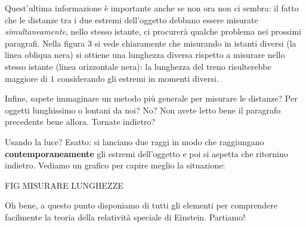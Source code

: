 Quest'ultima informazione è importante anche se non ora non ci sembra: il fatto che le distanze tra i due estremi dell'oggetto debbano essere misurate \textit{simultaneamente}, nello stesso istante, ci procurerà qualche problema nei prossimi paragrafi. Nella figura 3 si vede chiaramente che misurando in istanti diversi (la linea obliqua nera) si ottiene una lunghezza diversa rispetto a misurare nello stesso istante (linea orizzontale nera): la lunghezza del treno risulterebbe maggiore di $1$ considerando gli estremi in momenti diversi. 

Infine, sapete immaginare un metodo più generale per misurare le distanze? Per oggetti lunghissimo o lontani da noi? No? Non avete letto bene il paragrafo precedente bene allora. Tornate indietro?

Usando la luce? Esatto: si lanciano due raggi in modo che raggiungano \textbf{contemporaneamente} gli estremi dell'oggetto e poi si aspetta che ritornino indietro. Vediamo un grafico per capire meglio la situazione:

FIG MISURARE LUNGHEZZE

Oh bene, a questo punto disponiamo di tutti gli elementi per comprendere facilmente la teoria della relatività speciale di  Einstein. Partiamo!
